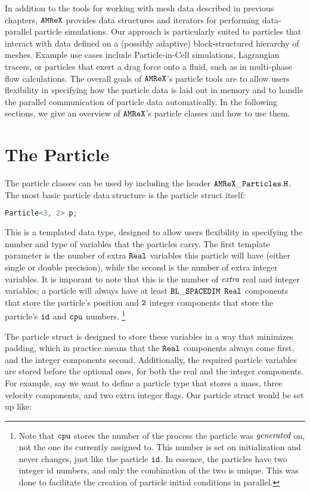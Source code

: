 In addition to the tools for working with mesh data described in previous chapters, $\tt{AMReX}$ provides data structures and iterators for performing data-parallel particle simulations. 
Our approach is particularly suited to particles that interact with data defined on a (possibly adaptive) block-structured hierarchy of meshes. Example use cases include Particle-in-Cell
simulations, Lagrangian tracers, or particles that exert a drag force onto a fluid, such as in multi-phase flow calculations. The overall goals of $\tt{AMReX}$'s particle 
tools are to allow users flexibility in specifying how the particle data is laid out in memory and to handle the parallel communication of particle data automatically.
In the following sections, we give an overview of $\tt{AMReX}$'s particle classes and how to use them.

\section{The Particle}
\label{sec:Particles:Particle}

The particle classes can be used by including the header $\tt{AMReX\_Particles.H}$. The most basic particle data structure is the particle struct itself: 

\begin{lstlisting}[language=cpp]
  Particle<3, 2> p;
\end{lstlisting}

This is a templated data type, designed to allow users flexibility in specifying the number and type of variables that the particles carry. The first template parameter is
the number of extra $\tt{Real}$ variables this particle will have (either single or double precision), while the second is the number of extra integer variables. It is imporant to note
that this is the number of $\emph{extra}$ real and integer variables; a particle will always have at least $\tt{BL\_SPACEDIM}$ $\tt{Real}$ components that store the particle's position
and $\tt{2}$ integer components that store the particle's $\tt{id}$ and $\tt{cpu}$ numbers.
\footnote{Note that $\tt{cpu}$ stores the number of the process the particle was $\emph{generated}$
on, not the one its currently assigned to. This number is set on initialization and never changes, just like the particle $\tt{id}$. In essence, the particles have two integer id numbers, and only the combination of the two is unique. This was done to facilitate the creation of particle initial conditions in parallel.}

The particle struct is designed to store these variables in a way that minimizes padding, which in practice means that the $\tt{Real}$ components always come first, and the integer
components second. Additionally, the required particle variables are stored before the optional ones, for both the real and the integer components. For example, say we want to define
a particle type that stores a mass, three velocity components, and two extra integer flags. Our particle struct would be set up like:

